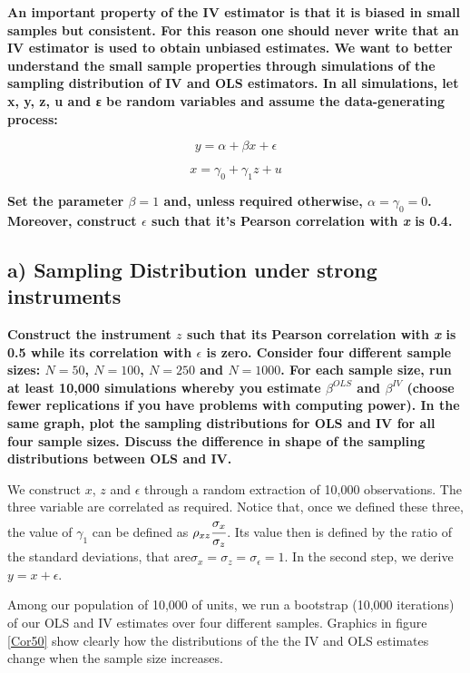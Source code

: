 \documentclass[a4paper,12pt,oneside,English]{article}
\begin{document}
\textbf{An important property of the IV estimator is that it is biased in small samples but consistent. For this reason one should never write that an IV estimator is used to obtain unbiased estimates. We want to better understand the small sample properties through simulations of the sampling distribution of IV and OLS estimators. In all simulations, let x, y, z, u and ε be random variables and assume the data-generating process:}

\begin{equation}
    y = \alpha+\beta x+ \epsilon
\end{equation}

\begin{equation}
    x = \gamma_0+\gamma_1z+ u
\end{equation}

\textbf{Set the parameter $\beta = 1$ and, unless required otherwise, $\alpha = \gamma_0 = 0$. Moreover, construct $\epsilon$ such that it's Pearson correlation with \textit{x} is 0.4.}


\subsection{a) Sampling Distribution under strong instruments}

\textbf{Construct the instrument $z$ such that its Pearson correlation with \textit{x} is 0.5 while its correlation with $\epsilon$ is zero. Consider four different sample sizes: $N = 50$, $N = 100$, $N = 250$ and $N = 1000$. For each sample size, run at least 10,000 simulations whereby you estimate $\beta^{OLS}$ and $\beta^{IV}$ (choose fewer replications if you have problems with computing power). In the same graph, plot the sampling distributions for OLS and IV for all four sample sizes. Discuss the difference in shape of the sampling distributions between OLS and IV.}

We construct $x$, $z$ and $\epsilon$ through a random extraction of 10,000 observations. The three variable are correlated as required. Notice that, once we defined these three, the value of $\gamma_1$ can be defined as $\rho_{xz}\cfrac{\sigma_x}{\sigma_z}$. Its value then is defined by the ratio of the standard deviations, that are$\sigma_x=\sigma_z=\sigma_\epsilon=1$. In the second step, we derive $y=x+\epsilon$.

Among our population of 10,000 of units, we run a bootstrap (10,000 iterations) of our OLS and IV estimates over four different samples.
Graphics in figure \ref{Cor50} show clearly how the distributions of the the IV and OLS estimates change when the sample size increases.
\end{document}
